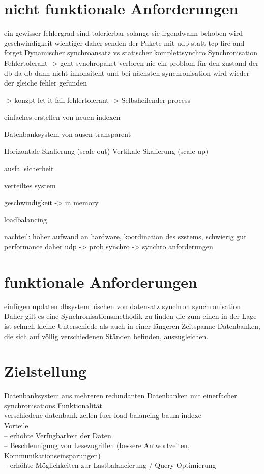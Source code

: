 \documentclass[a4paper,11pt,oneside,%
headsepline,												%
footsepline,												%
bibtotocnumbered									%
]{scrreprt}
\begin{document}
\section{nicht funktionale Anforderungen}
ein gewisser fehlergrad sind tolerierbar solange sie irgendwann behoben wird
geschwindigkeit wichtiger daher senden der Pakete mit udp statt tcp fire and forget
Dynamischer synchroansatz vs statischer komplettsynchro
Synchronisation Fehlertolerant -> geht synchropaket verloren nie ein problom für den zustand der db da db dann nicht inkonsitent und bei nächsten synchronisation wird wieder der gleiche fehler gefunden  

-> konzpt let it fail fehlertolerant 
-> Selbsheilender process

einfaches erstellen von neuen indexen

Datenbanksystem von ausen transparent

Horizontale Skalierung (scale out)  Vertikale Skalierung (scale up)

ausfallsicherheit

verteiltes system

geschwindigkeit -> in memory

loadbalancing

nachteil: hoher aufwand an hardware, koordination des szstems, schwierig gut performance daher udp -> prob synchro -> synchro anforderungen

\section{funktionale Anforderungen}
einfügen
updaten
dbsystem löschen von datensatz synchron
synchronisation
Daher gilt es eine Synchronisationsmethodik zu finden die zum einen in der Lage ist schnell kleine Unterschiede als auch in einer längeren Zeitspanne Datenbanken, die sich auf völlig verschiedenen Ständen befinden, auszugleichen.

\section{Zielstellung}
Datenbanksystem aus mehreren redundanten Datenbanken mit einerfacher synchronisations Funktionalität\\

verschiedene datenbank zellen fuer load balancing
baum indexe\\

Vorteile\\
– erhöhte Verfügbarkeit der Daten\\
– Beschleunigung von Lesezugriffen (bessere Antwortzeiten,
Kommunikationseinsparungen)\\
– erhöhte Möglichkeiten zur Lastbalancierung / Query-Optimierung\\
\end{document}
